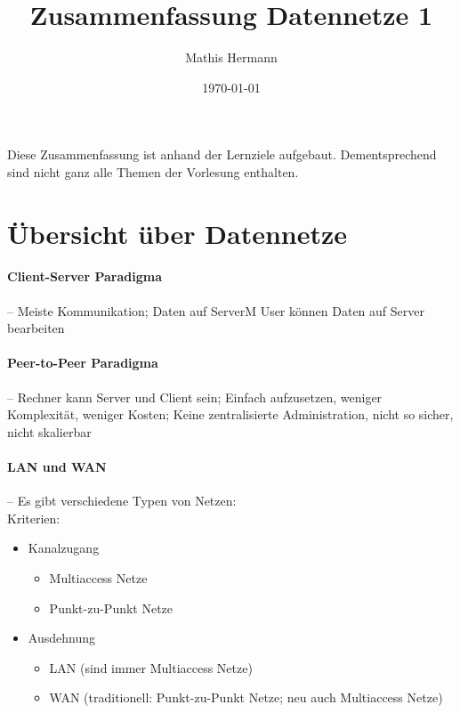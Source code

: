 \documentclass[a4paper,12pt]{article}
\begin{document}
\title{Zusammenfassung Datennetze 1}
\author{Mathis Hermann}
\date{\today}
\maketitle
Diese Zusammenfassung ist anhand der Lernziele aufgebaut. Dementsprechend sind nicht ganz alle Themen der Vorlesung enthalten.

\section{Übersicht über Datennetze}



\paragraph{Client-Server Paradigma} -- Meiste Kommunikation; Daten auf ServerM User können Daten auf Server bearbeiten

\paragraph{Peer-to-Peer Paradigma} -- Rechner kann Server und Client sein; Einfach aufzusetzen, weniger Komplexität, weniger Kosten; Keine zentralisierte Administration, nicht so sicher, nicht skalierbar

\paragraph{LAN und WAN} -- Es gibt verschiedene Typen von Netzen:\\
Kriterien:
\begin{itemize}
\item Kanalzugang
\begin{itemize}
\item Multiaccess Netze
\item Punkt-zu-Punkt Netze
\end{itemize}
\item Ausdehnung
\begin{itemize}
\item LAN (sind immer Multiaccess Netze)
\item WAN (traditionell: Punkt-zu-Punkt Netze; neu auch Multiaccess Netze)
\end{itemize}
\end{itemize}
\end{document}
